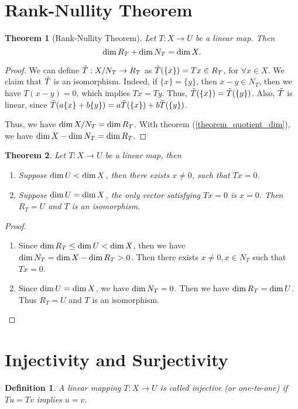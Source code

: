 \documentclass[11pt]{book}
\newtheorem{definition}{Definition}[section]
\newtheorem{theorem}{Theorem}[section]
\theoremstyle{definition}
\numberwithin{equation}{subsection}
\begin{document}
\section{Rank-Nullity Theorem}
\begin{theorem}[Rank-Nullity Theorem]
Let $T:X\to U$ be a linear map. Then $${\rm dim}\,R_T + {\rm dim}\,N_T = {\rm dim}\, X.$$
\end{theorem}
\begin{proof}
We can define $\Tilde{T}:X/N_T\to R_T$ as $\Tilde{T}(\{x\}) = Tx \in R_T$, for $\forall x\in X$. We claim that $\Tilde{T}$ is an isomorphism. Indeed, if $\{x\} = \{y\}$, then $x-y\in N_T$, then we have $T(x-y) = 0$, which implies $Tx = Ty$. Thus, $\Tilde{T}(\{x\}) = \Tilde{T}(\{y\})$. Also, $\Tilde{T}$ is linear, since $\Tilde{T}(a\{x\} + b\{y\}) = a\Tilde{T}(\{x\}) + b\Tilde{T}(\{y\})$. 

Thus, we have ${\rm dim}\, X/N_T = {\rm dim}\, R_T$. With theorem (\ref{theorem_quotient_dim}), we have ${\rm dim}\,X - {\rm dim}\,N_T = {\rm dim}\, R_T$.
\end{proof}

\medskip

\begin{theorem}
Let $T:X\to U$ be a linear map, then
\begin{enumerate}[label=(\alph*)]
    \item Suppose ${\rm dim}\,U < {\rm dim}\, X$, then there exists $x\neq 0$, such that $T x = 0$.
    \item Suppose ${\rm dim}\,U = {\rm dim}\, X$, the only vector satisfying $T x = 0$ is $x= 0$. Then $R_T = U$ and $T$ is an isomorphism.
\end{enumerate}
\end{theorem}
\begin{proof}
~\begin{enumerate}[label=(\alph*)]
    \item Since ${\rm dim}\,R_T \leq {\rm dim}\, U < {\rm dim}\, X$, then we have ${\rm dim}\, N_T = {\rm dim}\,X - {\rm dim}\,R_T > 0$. Then there exists $x \neq 0, x\in N_T$ such that $T x = 0$.
    \item Since ${\rm dim}\,U = {\rm dim}\, X$, we have ${\rm dim}\,N_T = 0$. Then we have ${\rm dim}\,R_T = {\rm dim}\,U$. Thus $R_T = U$ and $T$ is an isomorphism.
\end{enumerate}
\end{proof}

\medskip

\section{Injectivity and Surjectivity}
\begin{definition}
A linear mapping $T:X\to U$ is called injective (or one-to-one) if $Tu = Tv$ implies $u = v$.
\end{definition}
\end{document}
